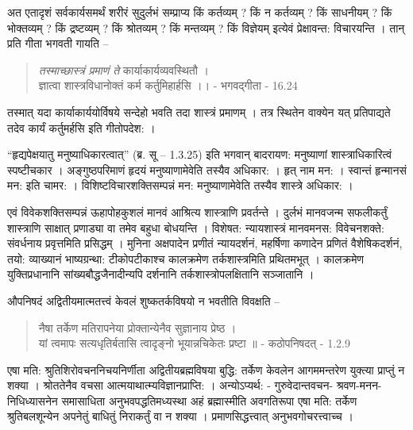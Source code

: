 अत एतादृशं सर्वकार्यसमर्थं शरीरं सुदुर्लभं सम्प्राप्य किं कर्तव्यम् ? किं न कर्तव्यम् ? किं साधनीयम् ? किं भोक्तव्यम् ? किं द्रष्टव्यम् ? किं श्रोतव्यम् ? किं मन्तव्यम् ? किं विज्ञेयम् इत्येवं प्रेक्षावन्त: विचारयन्ति । तान् प्रति गीता भगवती गायति –
\begin{verse}
\textit{तस्माच्छास्त्रं प्रमाणं ते} कार्याकार्यव्यवस्थितौ ।\\
ज्ञात्वा शास्त्रविधानोक्तं कर्म कर्तुमिहार्हसि ।। - भगवद्गीता - 16.24
\end{verse}
तस्मात् यदा कार्याकार्ययोर्विषये सन्देहो भवति तदा शास्त्रं प्रमाणम् । तत्र स्थितेन वाक्येन यत् प्रतिपाद्यते तदेव कार्यं कर्तुमर्हसि इति गीतोपदेश: ।

“हृद्यपेक्षयातु मनुष्याधिकारत्वात्” (ब्र. सू – 1.3.25) इति भगवान् बादरायण: मनुष्याणां शास्त्राधिकारित्वं स्पष्टीचकार । अङ्गुष्ठपरिमाणं हृदयं मनुष्याणामेवेति तस्यैव अधिकार: । हृत् नाम मन: । स्वान्तं हृन्मानसं मन: इति चामर: । विशिष्टविचारशक्तिसम्पन्नं मन: मनुष्याणामेवेति तस्यैव शास्त्रे अधिकार: ।

एवं विवेकशक्तिसम्पन्नं ऊहापोहकुशलं मानवं आश्रित्य शास्त्राणि प्रवर्तन्ते । दुर्लभं मानवजन्म सफलीकर्तुं शास्त्राणि साक्षात् प्रणाड्या वा तमेव बहुधा बोधयन्ति । विशेषत: न्यायशास्त्रं मानवमनस: विवेचनशक्ते: संवर्धनाय प्रवृत्तमिति प्रसिद्धम् । मुनिना अक्षपादेन प्रणीतं न्यायदर्शनं, महर्षिणा कणादेन प्रणितं वैशेषिकदर्शनं, तयो: व्याख्यानं भाष्यग्रन्था: टीकोपटीकाश्च कालक्रमेण तर्कशास्त्रमिति प्रथितमभूत् । कालक्रमेण युक्तिप्रधानानि सांख्यबौद्धजैनादीन्यपि दर्शनानि तर्कशास्त्रोपलक्षितानि सञ्जातानि ।

औपनिषदं अद्वितीयमात्मतत्त्वं केवलं शुष्कतर्कविषयो न भवतीति विवक्षति –
\begin{verse}
नैषा तर्केण मतिरापनेया प्रोक्तान्येनैव सुज्ञानाय प्रेष्ठ ।\\
यां त्वमापः सत्यधृतिर्बतासि त्वादृङ्नो भूयान्नचिकेतः प्रष्टा ॥ - कठोपनिषदत् - 1.2.9
\end{verse}
एषा मति: श्रुतिशिरोवचननिचयनिर्णीता अद्वितीयब्रह्मविषया बुद्धि: तर्केण केवलेन आगममन्तरेण युक्त्या प्राप्तुं न शक्या । श्रोततेनैव वचसा आत्मयाथात्म्यविज्ञानप्राप्ति: । अन्योऽप्यर्थ: - गुरुवेदान्तवचन- श्रवण-मनन-निधिध्यासनेन समासाधिता अनुभवपद्धतिमध्यस्था अहं ब्रह्मास्मीति अवगतिरूपा एषा मति: तर्केण श्रुतिबलशून्येन अपनेतुं बाधितुं निराकर्तुं वा न शक्या । प्रमाणसिद्धत्त्वात् अनुभवगोचरत्त्वाच्च ।

